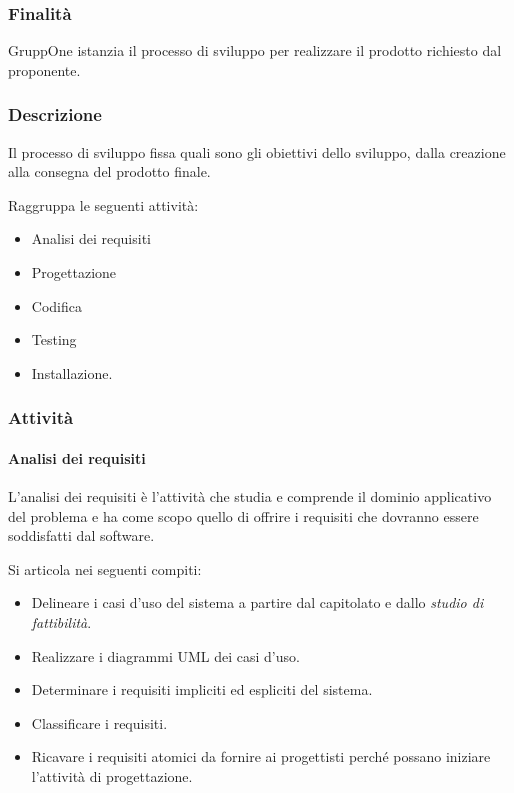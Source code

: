 \documentclass[../../norme-di-progetto.tex]{subfiles}
\begin{document}
\subsubsection{Finalità}%
\label{subs:sviluppo/finalita}

GruppOne istanzia il processo di sviluppo per realizzare il prodotto richiesto dal proponente.

\subsubsection{Descrizione}%
\label{subs:sviluppo/descrizione}

Il processo di sviluppo fissa quali sono gli obiettivi dello sviluppo, dalla creazione alla consegna del prodotto finale.

Raggruppa le seguenti attività:
\begin{itemize}
  \item Analisi dei requisiti
  \item Progettazione
  \item Codifica
  \item Testing
  \item Installazione.
\end{itemize}

\subsubsection{Attività}%
\label{subs:sviluppo/attivita}

\paragraph{Analisi dei requisiti}%
\label{par:analisi_dei_requisiti}
L'analisi dei requisiti è l'attività che studia e comprende il dominio applicativo del problema e ha come scopo quello di offrire i requisiti che dovranno essere soddisfatti dal software.

Si articola nei seguenti compiti:

\begin{itemize}
  \item Delineare i casi d'uso del sistema a partire dal capitolato e dallo \textit{studio di fattibilità}.
  \item Realizzare i diagrammi UML dei casi d'uso.
  \item Determinare i requisiti impliciti ed espliciti del sistema.
  \item Classificare i requisiti.
  \item Ricavare i requisiti atomici da fornire ai progettisti perché possano iniziare l'attività di progettazione.
\end{itemize}
\end{document}
